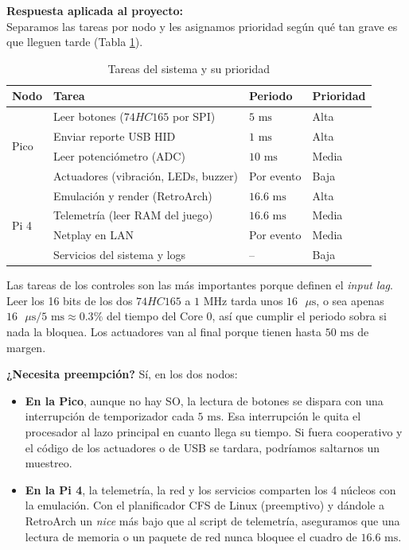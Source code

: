 \documentclass[conference]{IEEEtran}
\begin{document}
\textbf{Respuesta aplicada al proyecto:} \\
Separamos las tareas por nodo y les asignamos prioridad según qué tan grave es que lleguen tarde (Tabla \ref{tab:tareas_prio}).

\begin{table}[H]
	\centering
	\caption{Tareas del sistema y su prioridad}
	\label{tab:tareas_prio}
	\small
	\begin{tabular}{|p{0.9cm}|p{3.3cm}|p{1.2cm}|p{1.1cm}|}
		\hline
		\textbf{Nodo} & \textbf{Tarea} & \textbf{Periodo} & \textbf{Prioridad} \\
		\hline
		\multirow{4}{*}{Pico} & Leer botones ($74HC165$ por SPI) & $5\text{ ms}$ & Alta \\
		\cline{2-4}
		& Enviar reporte USB HID & $1\text{ ms}$ & Alta \\
		\cline{2-4}
		& Leer potenciómetro (ADC) & $10\text{ ms}$ & Media \\
		\cline{2-4}
		& Actuadores (vibración, LEDs, buzzer) & Por evento & Baja \\
		\hline
		\multirow{4}{*}{Pi 4} & Emulación y render (RetroArch) & $16.6\text{ ms}$ & Alta \\
		\cline{2-4}
		& Telemetría (leer RAM del juego) & $16.6\text{ ms}$ & Media \\
		\cline{2-4}
		& Netplay en LAN & Por evento & Media \\
		\cline{2-4}
		& Servicios del sistema y logs & -- & Baja \\
		\hline
	\end{tabular}
\end{table}

Las tareas de los controles son las más importantes porque definen el \textit{input lag}. Leer los 16 bits de los dos $74HC165$ a $1\text{ MHz}$ tarda unos $16\text{ }\mu\text{s}$, o sea apenas $16\text{ }\mu\text{s} / 5\text{ ms} \approx 0.3\%$ del tiempo del Core 0, así que cumplir el periodo sobra si nada la bloquea. Los actuadores van al final porque tienen hasta $50\text{ ms}$ de margen.

\textbf{¿Necesita preempción?} Sí, en los dos nodos:
\begin{itemize}
	\item \textbf{En la Pico}, aunque no hay SO, la lectura de botones se dispara con una interrupción de temporizador cada $5\text{ ms}$. Esa interrupción le quita el procesador al lazo principal en cuanto llega su tiempo. Si fuera cooperativo y el código de los actuadores o de USB se tardara, podríamos saltarnos un muestreo.
	\item \textbf{En la Pi 4}, la telemetría, la red y los servicios comparten los 4 núcleos con la emulación. Con el planificador CFS de Linux (preemptivo) y dándole a RetroArch un \textit{nice} más bajo que al script de telemetría, aseguramos que una lectura de memoria o un paquete de red nunca bloquee el cuadro de $16.6\text{ ms}$.
\end{itemize}
\end{document}
